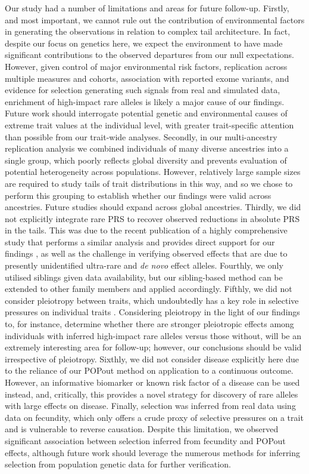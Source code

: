 \documentclass[12pt]{zHenriquesLab-StyleBioRxiv}
\begin{document}
{{Our study had a number of limitations and areas for future follow-up. 
Firstly, and most important, we cannot rule out the contribution of 
environmental factors in generating the observations in relation to 
complex tail architecture. In fact, despite our focus on genetics 
here, we expect the environment to have made significant contributions 
to the observed departures from our null expectations. However, 
given control of major environmental risk factors, replication across 
multiple measures and cohorts, association with reported exome variants, 
and evidence for selection generating such signals from real and simulated data, 
enrichment of high-impact rare alleles is likely a major cause of our findings. 
Future work should interrogate potential genetic and environmental causes of extreme 
trait values at the individual level, with greater trait-specific attention than possible 
from our trait-wide analyses. Secondly, in our multi-ancestry replication analysis we 
combined individuals of many diverse ancestries into a single group, which poorly 
reflects global diversity and prevents evaluation of potential heterogeneity across 
populations. However, relatively large sample sizes are required to study tails of trait distributions in this 
way, and so we chose to perform this grouping to establish whether our 
findings were valid across ancestries. Future studies should expand across global ancestries. 
Thirdly, we did not explicitly integrate rare PRS to recover observed reductions 
in absolute PRS in the tails. This was due to the recent publication of a highly comprehensive 
study that performs a similar analysis and provides direct support for our findings \cite{Fiziev2023}, 
as well as the challenge in verifying observed effects that are due to 
presently unidentified ultra-rare and  \emph{de novo} effect alleles. 
Fourthly, we only utilised siblings given data availability, but our
sibling-based method can be extended to other family members \cite{Souaiaia2024}
and applied accordingly. Fifthly, we did not consider pleiotropy between 
traits, which undoubtedly has a key role in selective pressures on individual traits \cite{Barghi2020}. 
Considering pleiotropy in the light of our findings to, for instance, determine 
whether there are stronger pleiotropic effects among individuals with 
inferred high-impact rare alleles versus those without, will be an extremely 
interesting area for follow-up; however, our conclusions should be valid 
irrespective of pleiotropy. Sixthly, we did not consider disease explicitly 
here due to the reliance of our POPout method on application to a continuous outcome. 
However, an informative biomarker or known risk factor of a 
disease can be used instead, and, critically, this provides a novel strategy 
for discovery of rare alleles with large effects on disease. 
Finally, selection was inferred from real data using data on fecundity, 
which only offers a crude proxy of selective pressures on a trait and 
is vulnerable to reverse causation. Despite this limitation, 
we observed significant association between selection inferred 
from fecundity and POPout effects, although future work should leverage 
the numerous methods for inferring selection from population genetic data for further verification. 

}}
\end{document}
